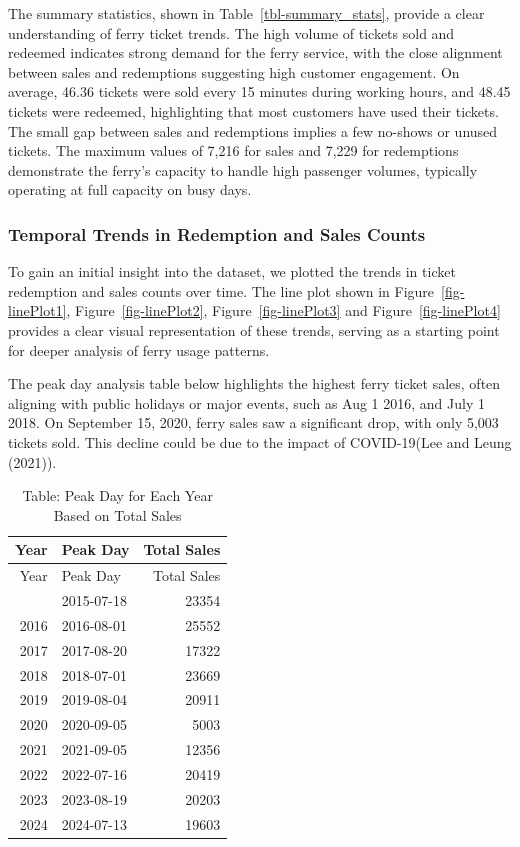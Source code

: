 \documentclass[
  letterpaper,
  DIV=11,
  numbers=noendperiod]{scrartcl}
\begin{document}
The summary statistics, shown in Table~\ref{tbl-summary_stats}, provide
a clear understanding of ferry ticket trends. The high volume of tickets
sold and redeemed indicates strong demand for the ferry service, with
the close alignment between sales and redemptions suggesting high
customer engagement. On average, 46.36 tickets were sold every 15
minutes during working hours, and 48.45 tickets were redeemed,
highlighting that most customers have used their tickets. The small gap
between sales and redemptions implies a few no-shows or unused tickets.
The maximum values of 7,216 for sales and 7,229 for redemptions
demonstrate the ferry's capacity to handle high passenger volumes,
typically operating at full capacity on busy days.

\subsubsection{Temporal Trends in Redemption and Sales
Counts}\label{sec-data-temporal}

To gain an initial insight into the dataset, we plotted the trends in
ticket redemption and sales counts over time. The line plot shown in
Figure~\ref{fig-linePlot1}, Figure~\ref{fig-linePlot2},
Figure~\ref{fig-linePlot3} and Figure~\ref{fig-linePlot4} provides a
clear visual representation of these trends, serving as a starting point
for deeper analysis of ferry usage patterns.

The peak day analysis table below highlights the highest ferry ticket
sales, often aligning with public holidays or major events, such as Aug
1 2016, and July 1 2018. On September 15, 2020, ferry sales saw a
significant drop, with only 5,003 tickets sold. This decline could be
due to the impact of COVID-19(Lee and Leung (2021)).

\begin{longtable}[]{@{}rlr@{}}
\caption{Table: Peak Day for Each Year Based on Total
Sales}\tabularnewline
\toprule\noalign{}
Year & Peak Day & Total Sales \\
\midrule\noalign{}
\endfirsthead
\toprule\noalign{}
Year & Peak Day & Total Sales \\
\midrule\noalign{}
\endhead
\bottomrule\noalign{}
\endlastfoot
2015 & 2015-07-18 & 23354 \\
2016 & 2016-08-01 & 25552 \\
2017 & 2017-08-20 & 17322 \\
2018 & 2018-07-01 & 23669 \\
2019 & 2019-08-04 & 20911 \\
2020 & 2020-09-05 & 5003 \\
2021 & 2021-09-05 & 12356 \\
2022 & 2022-07-16 & 20419 \\
2023 & 2023-08-19 & 20203 \\
2024 & 2024-07-13 & 19603 \\
\end{longtable}
\end{document}
